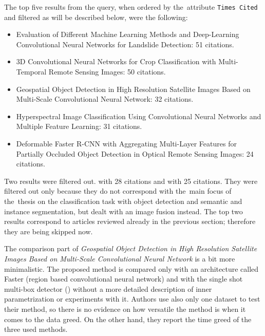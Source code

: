 \noindent The top five results from the query, when ordered by the~attribute \verb|Times Cited| and filtered as will be described below, were the following:

\begin{itemize}
	\item Evaluation of Different Machine Learning Methods and Deep-Learning Convolutional Neural Networks for Landslide Detection: 51 citations. \cite{landslide-evaluation}
	\item 3D Convolutional Neural Networks for Crop Classification with Multi-Temporal Remote Sensing Images: 50 citations. \cite{3d-cnn-crop}
	\item Geospatial Object Detection in High Resolution Satellite Images Based on Multi-Scale Convolutional Neural Network: 32 citations. \cite{object-detection-hrs-multi-scale}
	\item Hyperspectral Image Classification Using Convolutional Neural Networks and Multiple Feature Learning: 31 citations. \cite{hyperspectral-multiple-feat-cnn}
	\item Deformable Faster R-CNN with Aggregating Multi-Layer Features for Partially Occluded Object Detection in Optical Remote Sensing Images: 24 citations. \cite{deformable-faster-r-cnn}
\end{itemize}

Two results were filtered out. \cite{cnn-fusion-clouds} with 28 citations and \cite{cnn-fusion-hr-hsr} with 25 citations. They were filtered out only because they do not correspond with the~main focus of the~thesis on the classification task with object detection and semantic and instance segmentation, but dealt with an image fusion instead. The top two results correspond to articles reviewed already in the previous section; therefore they are being skipped now.

The comparison part of \textit{Geospatial Object Detection in High Resolution Satellite Images Based on Multi-Scale Convolutional Neural Network} is a bit more minimalistic. The proposed method is compared only with an architecture called Faster  (region based convolutional neural network) \cite{faster-rcnn} and with the single shot multi-box detector () \cite{ssd} without a more detailed description of inner parametrization or experiments with it. Authors use also only one dataset to test their method, so there is no evidence on how versatile the method is when it comes to the data greed. On the other hand, they report the time greed of the three used methods.

